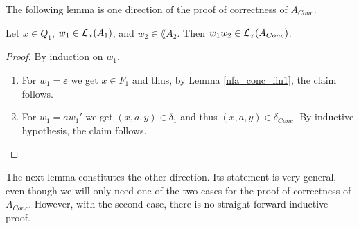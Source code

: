 
The following lemma is one direction of the proof of correctness of $A_{Conc}$.

\begin{lemma}
    \label{nfa_conc_aux2}
    Let $x \in Q_1$, $w_1 \in \mathcal{L}_{x}(A_1)$, and $w_2 \in \lang{A_2}$. Then $w_1 w_2 \in \mathcal{L}_{x}(A_{Conc})$.
\end{lemma}
\begin{proof}
    By induction on $w_1$.
    \begin{enumerate}
        \item For $w_1 = \varepsilon$ we get $x \in F_1$ and thus, by Lemma \ref{nfa_conc_fin1}, the claim follows.
        \item For $w_1 = aw_1'$ we get $(x,a,y) \in \delta_1$ and thus $(x,a,y) \in \delta_{Conc}$. By inductive hypothesis, the claim follows.
    \end{enumerate}
\end{proof}


The next lemma constitutes the other direction. 
Its statement is very general, even though we will only need one of the two cases for the proof of correctness of $A_{Conc}$.
However, with the second case, there is no straight-forward inductive proof.

